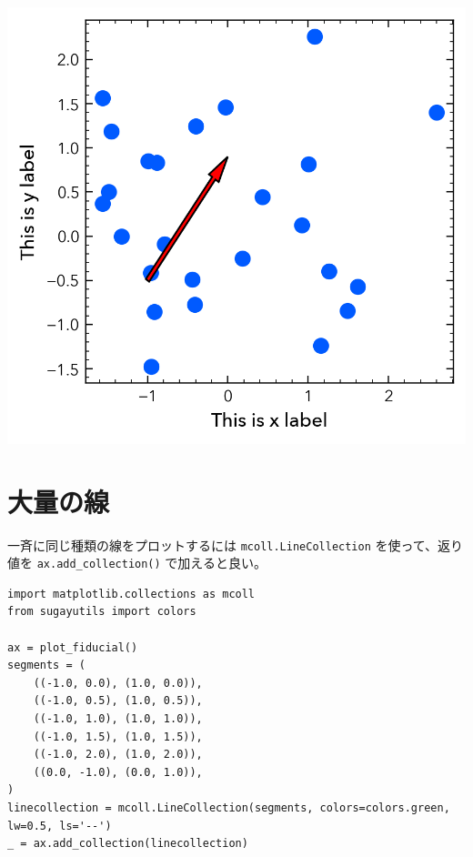\documentclass[a4paper, 10pt, notitlepage, twocolumn, uplatex, oneside, dvipdfmx]{jsarticle}
\begin{document}
\begin{center}
\includegraphics[width=1.0\linewidth]{./obipy-resources/params_arrow.png}
\end{center}
\section{大量の線}
\label{sec:org9855d63}
一斉に同じ種類の線をプロットするには \texttt{mcoll.LineCollection} を使って、返り値を \texttt{ax.add\_collection()} で加えると良い。
\begin{verbatim}
import matplotlib.collections as mcoll
from sugayutils import colors

ax = plot_fiducial()
segments = (
    ((-1.0, 0.0), (1.0, 0.0)),
    ((-1.0, 0.5), (1.0, 0.5)),
    ((-1.0, 1.0), (1.0, 1.0)),
    ((-1.0, 1.5), (1.0, 1.5)),
    ((-1.0, 2.0), (1.0, 2.0)),
    ((0.0, -1.0), (0.0, 1.0)),
)
linecollection = mcoll.LineCollection(segments, colors=colors.green, lw=0.5, ls='--')
_ = ax.add_collection(linecollection)
\end{verbatim}
\end{document}
